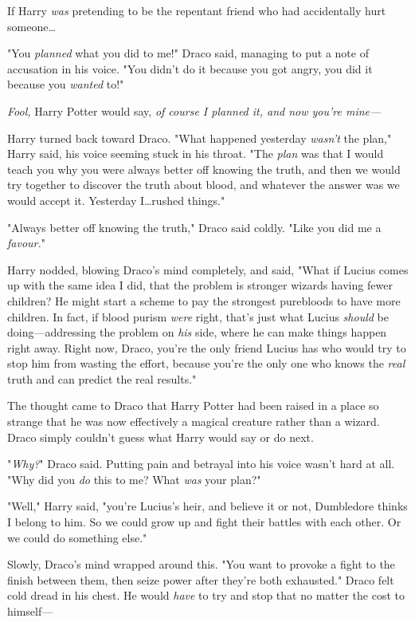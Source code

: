 If Harry \emph{was} pretending to be the repentant friend who had accidentally
hurt someone…

"You \emph{planned} what you did to me!" Draco said, managing to put a note of
accusation in his voice. "You didn't do it because you got angry, you did it
because you \emph{wanted} to!"

\emph{Fool,} Harry Potter would say, \emph{of course I planned it, and now
you're mine---}

Harry turned back toward Draco. "What happened yesterday \emph{wasn't} the
plan," Harry said, his voice seeming stuck in his throat. "The \emph{plan} was
that I would teach you why you were always better off knowing the truth, and
then we would try together to discover the truth about blood, and whatever the
answer was we would accept it. Yesterday I…rushed things."

"Always better off knowing the truth," Draco said coldly. "Like you did me a
\emph{favour.}"

Harry nodded, blowing Draco's mind completely, and said, "What if Lucius comes
up with the same idea I did, that the problem is stronger wizards having fewer
children? He might start a scheme to pay the strongest purebloods to have more
children. In fact, if blood purism \emph{were} right, that's just what Lucius
\emph{should} be doing---addressing the problem on \emph{his} side, where he
can make things happen right away. Right now, Draco, you're the only friend
Lucius has who would try to stop him from wasting the effort, because you're
the only one who knows the \emph{real} truth and can predict the real results."

The thought came to Draco that Harry Potter had been raised in a place so
strange that he was now effectively a magical creature rather than a wizard.
Draco simply couldn't guess what Harry would say or do next.

"\emph{Why?}" Draco said. Putting pain and betrayal into his voice wasn't hard
at all. "Why did you \emph{do} this to me? What \emph{was} your plan?"

"Well," Harry said, "you're Lucius's heir, and believe it or not, Dumbledore
thinks I belong to him. So we could grow up and fight their battles with each
other. Or we could do something else."

Slowly, Draco's mind wrapped around this. "You want to provoke a fight to the
finish between them, then seize power after they're both exhausted." Draco felt
cold dread in his chest. He would \emph{have} to try and stop that no matter
the cost to himself---

